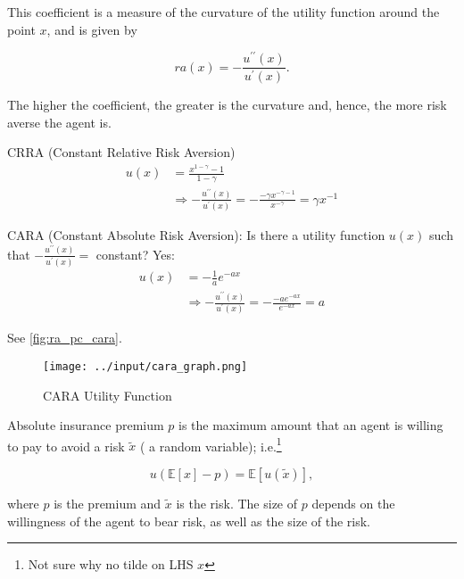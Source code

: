 \documentclass[10pt]{article}
\begin{document}
\begin{definition} 
    This coefficient is a measure of the curvature of the utility function around the point $x$, and is given by
    
    $$
    r a(x)=-\frac{u^{\prime \prime}(x)}{u^{\prime}(x)} .
    $$

    The higher the coefficient, the greater is the curvature and, hence, the more risk averse the agent is.
        
\end{definition}

\begin{example}
    CRRA (Constant Relative Risk Aversion)
    $$
    \begin{aligned}
    u(x) & =\frac{x^{1-\gamma}-1}{1-\gamma} \\
    & \Rightarrow-\frac{u^{\prime \prime}(x)}{u^{\prime}(x)}=-\frac{-\gamma x^{-\gamma-1}}{x^{-\gamma}}=\gamma x^{-1}
    \end{aligned}
    $$
\end{example}

\begin{example}
    CARA (Constant Absolute Risk Aversion):
    Is there a utility function $u(x)$ such that $-\frac{u^{\prime \prime}(x)}{u^{\prime}(x)}=$ constant?
    Yes:
    $$
    \begin{aligned}
    u(x) & =-\frac{1}{a} e^{-a x} \\
    & \Rightarrow-\frac{u^{\prime \prime}(x)}{u^{\prime}(x)}=-\frac{-a e^{-a x}}{e^{-a x}}=a
    \end{aligned}
    $$

    See \autoref{fig:ra_pc_cara}.

\begin{figure}[!htb]
    \centering
        \texttt{[image: ../input/cara\_graph.png]}
    \caption{CARA Utility Function}
    \label{fig:ra_pc_cara}
\end{figure}

\end{example}

\begin{definition} 
     

    Absolute insurance premium $p$ is the maximum amount that an agent is willing to pay to avoid a risk $\tilde{x}$ ( a random variable); i.e.\footnote{
        \color{red} Not sure why no tilde on LHS $x$
    }
    
    $$
    u(\mathbb{E}[x]-p)=\mathbb{E}[u(\tilde{x})],
    $$
    
    where $p$ is the premium and $\tilde{x}$ is the risk. The size of $p$ depends on the willingness of the agent to bear risk, as well as the size of the risk.

\end{definition}
\end{document}
